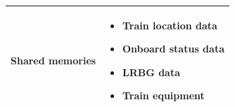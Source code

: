 \documentclass[nocc]{template/openetcs_report}
\begin{document}
\begin{longtable}{|l|l|}
				\hline								
				
					\begin{minipage}[t]{0.35\linewidth} Shared memories	\end{minipage} 
				&	\begin{minipage}[t]{0.65\linewidth}
						\begin{itemize}
							\item Train location data
							\item Onboard status data
							\item LRBG data
							\item Train equipment						
						\end{itemize}				
					\end{minipage} \\
				
				\hline	
			\end{longtable}	
\end{document}
